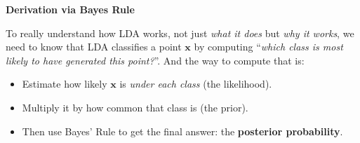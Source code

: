 \highspace
\begin{flushleft}
    \textcolor{Green3}{ \textbf{Derivation via Bayes Rule}}
\end{flushleft}
To really understand how LDA works, not just \emph{what it does} but \emph{why it works}, we need to know that LDA classifies a point $\mathbf{x}$ by computing ``\emph{which class is most likely to have generated this point?}''. And the way to compute that is:
\begin{itemize}
    \item Estimate how likely $\mathbf{x}$ is \emph{under each class} (the likelihood).
    \item Multiply it by how common that class is (the prior).
    \item Then use Bayes' Rule to get the final answer: the \textbf{posterior probability}.
\end{itemize}

